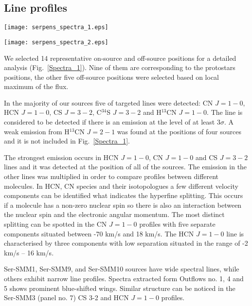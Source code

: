 \documentclass{aa}
\begin{document}
\subsection{Line profiles}

\begin{figure*}
   \centering
   \texttt{[image: serpens\_spectra\_1.eps]}
         \label{Spectra_1}
   \end{figure*}
\begin{figure*}
   \centering
   \texttt{[image: serpens\_spectra\_2.eps]}
      \caption{Serpens Main sources spectra of C$^{34}$S $J=3-2$, CS $J=3-2$, H$^{13}$CN $J=1-0$, HCN $J=1-0$ and CN $J=1-0$ lines.}
         \label{Spectra_1}
   \end{figure*}

We selected 14 representative on-source and off-source positions for a detailed analysis (Fig.~\ref{Spectra_1}). Nine of them are corresponding to the protostars positions, the other five off-source positions were selected based on local maximum of the flux.   

In the majority of our sources five of targeted lines were detected: CN $J=1-0$, HCN $J=1-0$, CS $J=3-2$, C$^{34}$S $J=3-2$ and H$^{13}$CN $J=1-0$. The line is considered to be detected if there is an emission at the level of at least 3$\sigma$. A weak emission from H$^{13}$CN $J=2-1$ was found at the positions of four sources and it is not included in Fig.~\ref{Spectra_1}. 

The strongest emission occurs in HCN $J=1-0$, CN $J=1-0$ and CS $J=3-2$ lines and it was detected at the position of all of the sources. The emission in the other lines was multiplied in order to compare profiles between different molecules. In HCN, CN species and their isotopologues a few different velocity components can be identified what indicates the hyperfine splitting. This occurs if a molecule has a non-zero nuclear spin so there is also an interaction between the nuclear spin and the electronic angular momentum. The most distinct splitting can be spotted in the CN $J=1-0$ profiles with five separate components situated between -70 km/s and 18 km/s. The HCN $J=1-0$ line is characterised by three components with low separation situated in the range of -2 km/s – 16 km/s. 

Ser-SMM1, Ser-SMM9, and Ser-SMM10 sources have wide spectral lines, while others exhibit narrow line profiles. Spectra extracted form Outflows no. 1, 4 and 5 shows prominent blue-shifted wings. Similar structure can be noticed in the Ser-SMM3 (panel no. 7) CS 3-2 and HCN $J=1-0$ profiles. 
\end{document}
